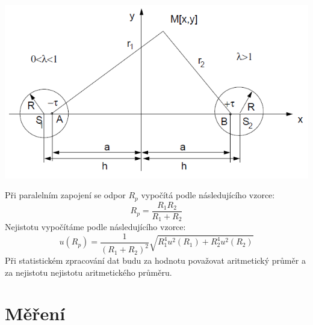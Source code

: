 \documentclass[a4paper,11pt]{article}
\begin{document}
    \begin{minipage}[]{0.5\textwidth}
        \centering
            \includegraphics[scale=0.35]{Výpočet potenciálu v bodě M od dvou válcových nekonečných vodičů s poloměrem R, mezi nimiž je rozdíl potenciálů U}
            \captionsetup{justification=centering, font=footnotesize}
            \label{fig:Výpočet potenciálu v bodě M od dvou válcových nekonečných vodičů s poloměrem R, mezi nimiž je rozdíl potenciálů U}
        \vspace{20pt}
        \raggedright
        Při paralelním zapojení se odpor $R_p$ vypočítá podle následujícího vzorce: 
        \begin{equation}
            R_p = \frac{R_1 R_2}{R_1 + R_2}
        \end{equation}
        Nejistotu vypočítáme podle následujícího vzorce: 
        \begin{equation}
            u(R_p) = \frac{1}{(R_1 + R_2)^2} \sqrt{R_1^4u^2(R_1)+R_2^4u^2(R_2)}
        \end{equation}
        Při statistickém zpracování dat budu za hodnotu považovat aritmetický průměr a za nejistotu nejistotu aritmetického průměru.
        
        \section{Měření}

\end{minipage}
\end{document}
